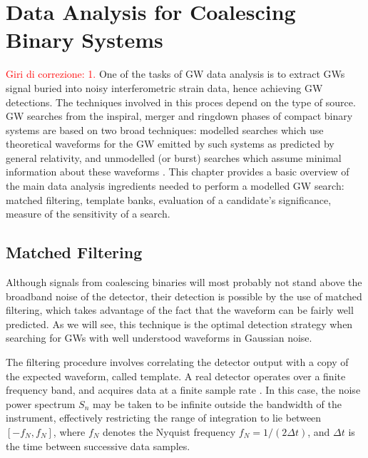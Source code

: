 \documentclass[binding=0.6cm, LaM]{sapthesis}
\newcommand{\fpg}[1]{\textcolor{red}{#1} }
\begin{document}
\chapter{Data Analysis for Coalescing Binary Systems}
\label{ch:datatools}
\fpg{Giri di correzione: 1.}%
	One of the tasks of GW data analysis is to extract GWs signal 
	buried into noisy interferometric strain data, hence achieving GW detections.
	The techniques involved in this proces depend on the type of source.
	GW searches from the inspiral, merger and ringdown phases of compact binary systems 
	are based on two broad techniques: 
	modelled searches which use theoretical waveforms for the GW emitted by such systems 
	as predicted by general relativity, and 
	unmodelled (or burst) searches which assume minimal information about these waveforms \cite{23}.
        This chapter provides a basic overview of the main data analysis ingredients needed to perform a modelled GW search:
        matched filtering, template banks, evaluation of a candidate's significance, measure of the sensitivity of a search.

\section{Matched Filtering}
\label{sec:matched_filtering}
	Although signals from coalescing binaries will most probably not stand above the broadband noise of the detector, 
	their detection is possible by the use of matched filtering, 
	which takes advantage of the fact that the waveform can be fairly well predicted. 
	As we will see, this technique is the optimal detection strategy when searching for GWs
        with well understood waveforms in Gaussian noise.

	The filtering procedure involves correlating the detector output 
	with a copy of the expected waveform, 
	called template.
	A real detector operates over a finite frequency band, 
	and acquires data at a finite sample rate \cite{24}. 
	In this case, the noise power spectrum $S_n$ 
	may be taken to be infinite outside the bandwidth of the instrument, 
	effectively restricting the range of integration to lie between $[-f_N, f_N]$, 
	where $f_N$ denotes the Nyquist frequency $f_N = 1/(2\Delta t)$, 
	and $\Delta t$ is the time between successive data samples.
\end{document}
